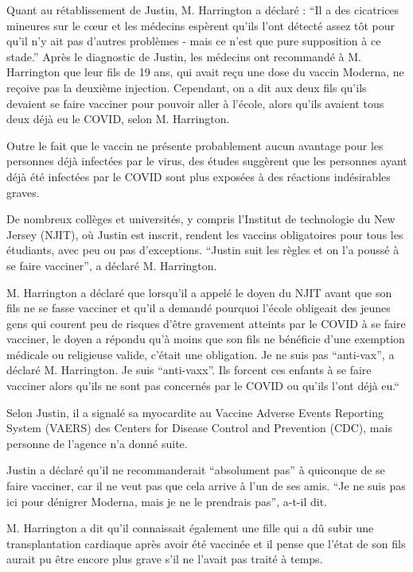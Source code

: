 Quant au rétablissement de Justin, M. Harrington a déclaré : “Il a des
cicatrices mineures sur le cœur et les médecins espèrent qu'ils l'ont détecté
assez tôt pour qu'il n'y ait pas d'autres problèmes - mais ce n'est que pure
supposition à ce stade.” Après le diagnostic de Justin, les médecins ont
recommandé à M. Harrington que leur fils de 19 ans, qui avait reçu une dose du
vaccin Moderna, ne reçoive pas la deuxième injection. Cependant, on a dit aux
deux fils qu'ils devaient se faire vacciner pour pouvoir aller à l'école, alors
qu'ils avaient tous deux déjà eu le COVID, selon M. Harrington.

Outre le fait que le vaccin ne présente probablement aucun avantage pour les
personnes déjà infectées par le virus, des études suggèrent que les personnes
ayant déjà été infectées par le COVID sont plus exposées à des réactions
indésirables graves.

De nombreux collèges et universités, y compris l'Institut de technologie du New
Jersey (NJIT), où Justin est inscrit, rendent les vaccins obligatoires pour tous
les étudiants, avec peu ou pas d'exceptions. “Justin suit les règles et on l'a
poussé à se faire vacciner”, a déclaré M. Harrington.

M. Harrington a déclaré que lorsqu'il a appelé le doyen du NJIT avant que son
fils ne se fasse vacciner et qu'il a demandé pourquoi l'école obligeait des
jeunes gens qui courent peu de risques d'être gravement atteints par le COVID à
se faire vacciner, le doyen a répondu qu'à moins que son fils ne bénéficie d'une
exemption médicale ou religieuse valide, c'était une obligation. Je ne suis pas
“anti-vax”, a déclaré M. Harrington. Je suis “anti-vaxx”. Ils forcent ces
enfants à se faire vacciner alors qu'ils ne sont pas concernés par le COVID ou
qu'ils l'ont déjà eu.“

Selon Justin, il a signalé sa myocardite au Vaccine Adverse Events Reporting
System (VAERS) des Centers for Disease Control and Prevention (CDC), mais
personne de l'agence n'a donné suite.

Justin a déclaré qu'il ne recommanderait “absolument pas” à quiconque de se
faire vacciner, car il ne veut pas que cela arrive à l'un de ses amis. “Je ne
suis pas ici pour dénigrer Moderna, mais je ne le prendrais pas”, a-t-il dit.

M. Harrington a dit qu'il connaissait également une fille qui a dû subir une
transplantation cardiaque après avoir été vaccinée et il pense que l'état de son
fils aurait pu être encore plus grave s'il ne l'avait pas traité à temps.

